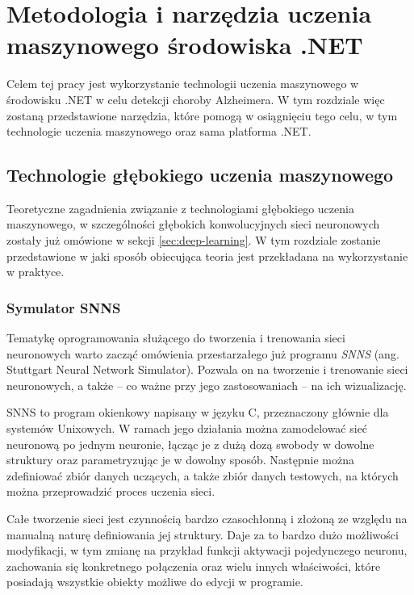 \chapter{Metodologia i narzędzia uczenia maszynowego środowiska .NET}

Celem tej pracy jest wykorzystanie technologii uczenia maszynowego w środowisku .NET w celu detekcji choroby Alzheimera.
W tym rozdziale więc zostaną przedstawione narzędzia, które pomogą w osiągnięciu tego celu, w tym technologie uczenia maszynowego oraz sama platforma .NET.

\section{Technologie głębokiego uczenia maszynowego}

Teoretyczne zagadnienia związanie z technologiami głębokiego uczenia maszynowego, w szczególności głębokich konwolucyjnych sieci neuronowych zostały już omówione w sekcji \ref{sec:deep-learning}.
W tym rozdziale zostanie przedstawione w jaki sposób obiecująca teoria jest przekładana na wykorzystanie w praktyce.

\subsection{Symulator SNNS}

Tematykę oprogramowania służącego do tworzenia i trenowania sieci neuronowych warto zacząć omówienia przestarzałego już programu \emph{SNNS} (ang. Stuttgart Neural Network Simulator).
Pozwala on na tworzenie i trenowanie sieci neuronowych, a także -- co ważne przy jego zastosowaniach -- na ich wizualizację.

SNNS to program okienkowy napisany w języku C, przeznaczony głównie dla systemów Unixowych.
W ramach jego działania można zamodelować sieć neuronową po jednym neuronie, łącząc je z dużą dozą swobody w dowolne struktury oraz parametryzując je w dowolny sposób.
Następnie można zdefiniować zbiór danych uczących, a także zbiór danych testowych, na których można przeprowadzić proces uczenia sieci.

Całe tworzenie sieci jest czynnością bardzo czasochłonną i złożoną ze względu na manualną naturę definiowania jej struktury.
Daje za to bardzo dużo możliwości modyfikacji, w tym zmianę na przykład funkcji aktywacji pojedynczego neuronu, zachowania się konkretnego połączenia oraz wielu innych właściwości, które posiadają wszystkie obiekty możliwe do edycji w programie.


